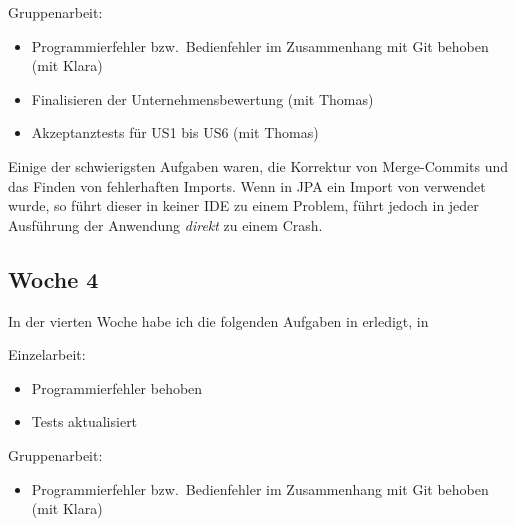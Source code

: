 Gruppenarbeit:

\begin{itemize}
    \item Programmierfehler bzw.\ Bedienfehler im Zusammenhang mit Git behoben (mit Klara)
    \item Finalisieren der Unternehmensbewertung (mit Thomas)
    \item Akzeptanztests für US1 bis US6 (mit Thomas)
\end{itemize}

Einige der schwierigsten Aufgaben waren, die Korrektur von Merge-Commits und das Finden von
fehlerhaften Imports.
Wenn in JPA ein Import von  verwendet wurde, so führt dieser in keiner IDE
zu einem Problem, führt jedoch in jeder Ausführung der Anwendung \emph{direkt} zu einem Crash.

\subsection{Woche 4}\label{subsec:s2w4}
In der vierten Woche habe ich die folgenden Aufgaben in erledigt, in

Einzelarbeit:
\begin{itemize}
    \item Programmierfehler behoben
    \item Tests aktualisiert
\end{itemize}

Gruppenarbeit:

\begin{itemize}
    \item Programmierfehler bzw.\ Bedienfehler im Zusammenhang mit Git behoben (mit Klara)
\end{itemize}


